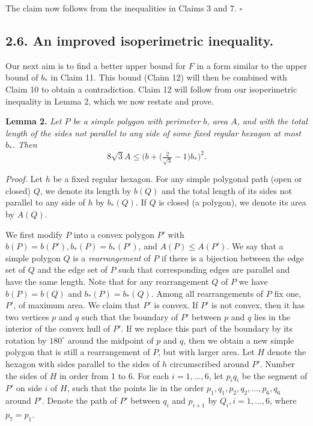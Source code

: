 \documentclass{article}
\begin{document}
The claim now follows from the inequalities in Claims 3 and 7. \hfill$\square$

\subsection*{2.6. An improved isoperimetric inequality.}

Our next aim is to find a better upper bound for $F$ in a form similar to the upper bound of $b_{*}$ in Claim 11. This bound (Claim 12) will then be combined with Claim 10 to obtain a contradiction. Claim 12 will follow from our isoperimetric inequality in Lemma 2, which we now restate and prove.

\textbf{Lemma 2.} \textit{Let $P$ be a simple polygon with perimeter $b$, area $A$, and with the total length of the sides not parallel to any side of some fixed regular hexagon at most $b_{*}$. Then} 
\begin{equation*}
8\sqrt{3}A \le \bigl(b + \bigl(\tfrac{2}{\sqrt{3}} - 1\bigr)b_*\bigr)^2.
\end{equation*}

\textit{Proof.} Let $h$ be a fixed regular hexagon. For any simple polygonal path (open or closed) $Q$, we denote its length by $b(Q)$ and the total length of its sides not parallel to any side of $h$ by $b_{*}(Q)$. If $Q$ is closed (a polygon), we denote its area by $A(Q)$.

We first modify $P$ into a convex polygon $P'$ with $b(P) = b(P'), b_{*}(P) = b_{*}(P')$, and $A(P) \le A(P')$. We say that a simple polygon $Q$ is a \textit{rearrangement} of $P$ if there is a bijection between the edge set of $Q$ and the edge set of $P$ such that corresponding edges are parallel and have the same length. Note that for any rearrangement $Q$ of $P$ we have $b(P) = b(Q)$ and $b_{*}(P) = b_{*}(Q)$. Among all rearrangements of $P$ fix one, $P'$, of maximum area. We claim that $P'$ is convex. If $P'$ is not convex, then it has two vertices $p$ and $q$ such that the boundary of $P'$ between $p$ and $q$ lies in the interior of the convex hull of $P'$. If we replace this part of the boundary by its rotation by $180^{\circ}$ around the midpoint of $p$ and $q$, then we obtain a new simple polygon that is still a rearrangement of $P$, but with larger area. Let $H$ denote the hexagon with sides parallel to the sides of $h$ circumscribed around $P'$. Number the sides of $H$ in order from 1 to 6. For each $i = 1, \ldots, 6$, let $p_{i}q_{i}$ be the segment of $P'$ on side $i$ of $H$, such that the points lie in the order $p_{1}, q_{1}, p_{2}, q_{2}, \ldots, p_{6}, q_{6}$ around $P'$. Denote the path of $P'$ between $q_{i}$ and $p_{i + 1}$ by $Q_{i}, i = 1, \ldots, 6$, where $p_{7} = p_{1}$.
\end{document}
